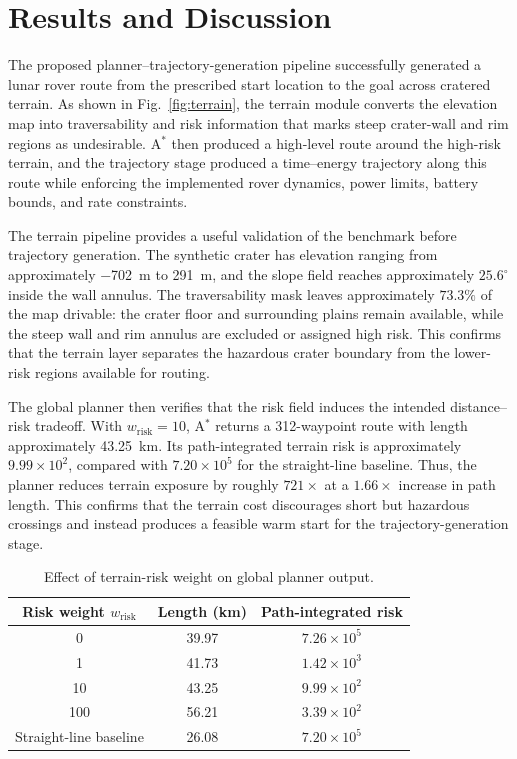 \documentclass[conf]{new-aiaa}
\begin{document}
\section{Results and Discussion}
The proposed planner--trajectory-generation pipeline successfully generated a lunar rover route from the prescribed start location to the goal across cratered terrain. As shown in Fig.~\ref{fig:terrain}, the terrain module converts the elevation map into traversability and risk information that marks steep crater-wall and rim regions as undesirable. A$^\ast$ then produced a high-level route around the high-risk terrain, and the trajectory stage produced a time--energy trajectory along this route while enforcing the implemented rover dynamics, power limits, battery bounds, and rate constraints.

The terrain pipeline provides a useful validation of the benchmark before trajectory generation. The synthetic crater has elevation ranging from approximately \SI{-702}{m} to \SI{291}{m}, and the slope field reaches approximately $25.6^\circ$ inside the wall annulus. The traversability mask leaves approximately $73.3\%$ of the map drivable: the crater floor and surrounding plains remain available, while the steep wall and rim annulus are excluded or assigned high risk. This confirms that the terrain layer separates the hazardous crater boundary from the lower-risk regions available for routing.

The global planner then verifies that the risk field induces the intended distance--risk tradeoff. With $w_{\mathrm{risk}}=10$, A$^\ast$ returns a 312-waypoint route with length approximately \SI{43.25}{km}. Its path-integrated terrain risk is approximately $9.99\times10^2$, compared with $7.20\times10^5$ for the straight-line baseline. Thus, the planner reduces terrain exposure by roughly $721\times$ at a $1.66\times$ increase in path length. This confirms that the terrain cost discourages short but hazardous crossings and instead produces a feasible warm start for the trajectory-generation stage.

\begin{table}[t]
\centering
\caption{Effect of terrain-risk weight on global planner output.}
\label{tab:risk_weight_sweep}
\begin{tabular}{ccc}
\toprule
Risk weight $w_{\mathrm{risk}}$ & Length (km) & Path-integrated risk \\
\midrule
0   & 39.97 & $7.26\times10^5$ \\
1   & 41.73 & $1.42\times10^3$ \\
10  & 43.25 & $9.99\times10^2$ \\
100 & 56.21 & $3.39\times10^2$ \\
\midrule
Straight-line baseline & 26.08 & $7.20\times10^5$ \\
\bottomrule
\end{tabular}
\end{table}
\end{document}
